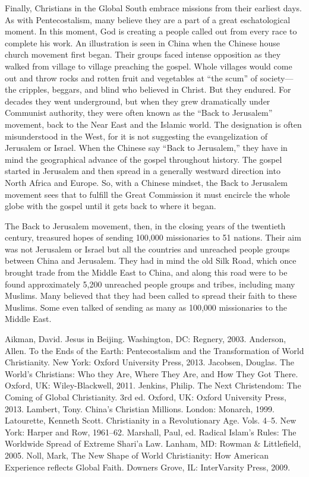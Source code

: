 Finally, Christians in the Global South embrace missions from their earliest days. As with
Pentecostalism, many believe they are a part of a great eschatological moment. In this moment, God
is creating a people called out from every race to complete his work. An illustration is seen in
China when the Chinese house church movement first began. Their groups faced intense opposition as
they walked from village to village preaching the gospel. Whole villages would come out and throw
rocks and rotten fruit and vegetables at “the scum” of society—the cripples, beggars, and blind who
believed in Christ. But they endured. For decades they went underground, but when they grew
dramatically under Communist authority, they were often known as the “Back to Jerusalem” movement,
back to the Near East and the Islamic world. The designation is often misunderstood in the West, for
it is not suggesting the evangelization of Jerusalem or Israel. When the Chinese say “Back to
Jerusalem,” they have in mind the geographical advance of the gospel throughout history. The gospel
started in Jerusalem and then spread in a generally westward direction into North Africa and Europe.
So, with a Chinese mindset, the Back to Jerusalem movement sees that to fulfill the Great Commission
it must encircle the whole globe with the gospel until it gets back to where it began.

The Back to Jerusalem movement, then, in the closing years of the twentieth century, treasured hopes
of sending 100,000 missionaries to 51 nations. Their aim was not Jerusalem or Israel but all the
countries and unreached people groups between China and Jerusalem. They had in mind the old Silk
Road, which once brought trade from the Middle East to China, and along this road were to be found
approximately 5,200 unreached people groups and tribes, including many Muslims. Many believed that
they had been called to spread their faith to these Muslims. Some even talked of sending as many as
100,000 missionaries to the Middle East.

\begin{readinglist}
\entry Aikman, David. Jesus in Beijing. Washington, DC: Regnery, 2003.
\entry *Anderson, Allen. To the Ends of the Earth: Pentecostalism and the Transformation of World
  Christianity. New York: Oxford University Press, 2013.
\entry *Jacobsen, Douglas. The World’s Christians: Who they Are, Where They Are, and How They Got
  There. Oxford, UK: Wiley-Blackwell, 2011.
\entry *Jenkins, Philip. The Next Christendom: The Coming of Global Christianity. 3rd ed. Oxford,
  UK: Oxford University Press, 2013.
\entry Lambert, Tony. China’s Christian Millions. London: Monarch, 1999.
\entry *Latourette, Kenneth Scott. Christianity in a Revolutionary Age. Vols. 4–5. New York: Harper
  and Row, 1961–62.
\entry Marshall, Paul, ed. Radical Islam’s Rules: The Worldwide Spread of Extreme Shari’a Law.
  Lanham, MD: Rowman \& Littlefield, 2005.
\entry *Noll, Mark, The New Shape of World Christianity: How American Experience reflects Global
  Faith. Downers Grove, IL: InterVarsity Press, 2009.
\end{readinglist}

